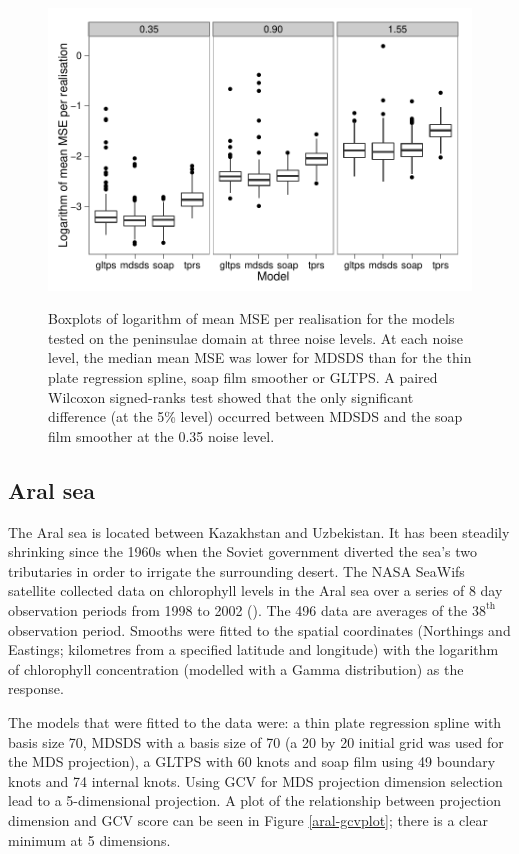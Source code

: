 \documentclass[smallextended]{svjour3}       %
\begin{document}
\begin{figure}
\centering
\includegraphics{examples/wt2/wt2-result.pdf} \\
\caption{Boxplots of logarithm of mean MSE per realisation for the models tested on the peninsulae domain at three noise levels. At each noise level, the median mean MSE was lower for MDSDS than for the thin plate regression spline, soap film smoother or GLTPS. A paired Wilcoxon signed-ranks test showed that the only significant difference (at the 5\% level) occurred between MDSDS and the soap film smoother at the 0.35 noise level.}
\label{wt2-boxplots}
\end{figure}


\subsection{Aral sea}

The Aral sea is located between Kazakhstan and Uzbekistan. It has been steadily shrinking since the 1960s when the Soviet government diverted the sea's two tributaries in order to irrigate the surrounding desert. The NASA SeaWifs satellite collected data on chlorophyll levels in the Aral sea over a series of 8 day observation periods from 1998 to 2002 (\cite{Wood:2008vo}). The 496 data are averages of the $38^\text{th}$ observation period. Smooths were fitted to the spatial coordinates (Northings and Eastings; kilometres from a specified latitude and longitude) with the logarithm of chlorophyll concentration (modelled with a Gamma distribution) as the response.

The models that were fitted to the data were: a thin plate regression spline with basis size 70, MDSDS with a basis size of 70 (a 20 by 20 initial grid was used for the MDS projection), a GLTPS with 60 knots and soap film using 49 boundary knots and 74 internal knots. Using GCV for MDS projection dimension selection lead to a 5-dimensional projection. A plot of the relationship between projection dimension and GCV score can be seen in Figure \ref{aral-gcvplot}; there is a clear minimum at 5 dimensions.
\end{document}
